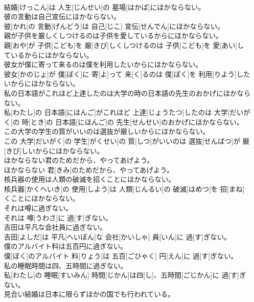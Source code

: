 \documentclass[8pt]{extreport}
\begin{document}
\begin{CJK}{UTF8}{min}
\\	結婚[けっこん]は 人生[じんせい]の 墓場[はかば]にほかならない。
\\	彼の言動は自己宣伝にほかならない。	
\\	彼[かれ]の 言動[げんどう]は 自己[じこ] 宣伝[せんでん]にほかならない。
\\	親が子供を厳しくしつけるのは子供を愛しているからにほかならない。	
\\	親[おや]が 子供[こども]を 厳[きび]しくしつけるのは 子供[こども]を 愛[あい]しているからにほかならない。
\\	彼女が僕に寄って来るのは僕を利用したいからにほかならない。	
\\	彼女[かのじょ]が 僕[ぼく]に 寄[よ]って 来[く]るのは 僕[ぼく]を 利用[りよう]したいからにほかならない。
\\	私の日本語がこれほど上達したのは大学の時の日本語の先生のおかげにほかならない。	
\\	私[わたし]の 日本語[にほんご]がこれほど 上達[じょうたつ]したのは 大学[だいがく]の 時[とき]の 日本語[にほんご]の 先生[せんせい]のおかげにほかならない。
\\	この大学の学生の質がいいのは選抜が厳しいからにほかならない。	
\\	この 大学[だいがく]の 学生[がくせい]の 質[しつ]がいいのは 選抜[せんばつ]が 厳[きび]しいからにほかならない。
\\	ほかならない君のためだから、やってあげよう。	
\\	ほかならない 君[きみ]のためだから、やってあげよう。
\\	核兵器の使用は人類の破滅を招くことにほかならない。	
\\	核兵器[かくへいき]の 使用[しよう]は 人類[じんるい]の 破滅[はめつ]を 招[まね]くことにほかならない。
\\	それは噂に過ぎない。	
\\	それは 噂[うわさ]に 過[す]ぎない。
\\	吉田は平凡な会社員に過ぎない。	
\\	吉田[よしだ]は 平凡[へいぼん]な 会社[かいしゃ] 員[いん]に 過[す]ぎない。
\\	僕のアルバイト料は五百円に過ぎない。	
\\	僕[ぼく]のアルバイト 料[りょう]は 五百[ごひゃく] 円[えん]に 過[す]ぎない。
\\	私の睡眠時間は四、五時間に過ぎない。	
\\	私[わたし]の 睡眠[すいみん] 時間[じかん]は四[し]、五時間[ごじかん]に 過[す]ぎない。
\\	見合い結婚は日本に限らずほかの国でも行われている。	

\end{CJK}
\end{document}
